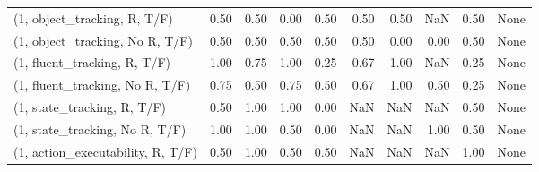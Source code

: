 \begin{table*}[h!]
\begin{adjustbox}{width=2\columnwidth,center}
\begin{tabular}{lrrr|rrr|rrr}
\midrule
(1, object\_tracking, R, T/F)         &                      0.50 &                  0.50 &                      0.00 &                          0.50 &                      0.50 &                          0.50 &                                    NaN &                               0.50 &                                  None \\
(1, object\_tracking, No R, T/F)      &                      0.50 &                  0.50 &                      0.50 &                          0.50 &                      0.50 &                          0.00 &                                   0.00 &                               0.50 &                                  None \\
(1, fluent\_tracking, R, T/F)         &                      1.00 &                  0.75 &                      1.00 &                          0.25 &                      0.67 &                          1.00 &                                    NaN &                               0.25 &                                  None \\
(1, fluent\_tracking, No R, T/F)      &                      0.75 &                  0.50 &                      0.75 &                          0.50 &                      0.67 &                          1.00 &                                   0.50 &                               0.25 &                                  None \\
(1, state\_tracking, R, T/F)          &                      0.50 &                  1.00 &                      1.00 &                          0.00 &                       NaN &                           NaN &                                    NaN &                               0.50 &                                  None \\
(1, state\_tracking, No R, T/F)       &                      1.00 &                  1.00 &                      0.50 &                          0.00 &                       NaN &                           NaN &                                   1.00 &                               0.50 &                                  None \\
(1, action\_executability, R, T/F)    &                      0.50 &                  1.00 &                      0.50 &                          0.50 &                       NaN &                           NaN &                                    NaN &                               1.00 &                                  None \\

\end{tabular}
\end{adjustbox}
\end{table*}
